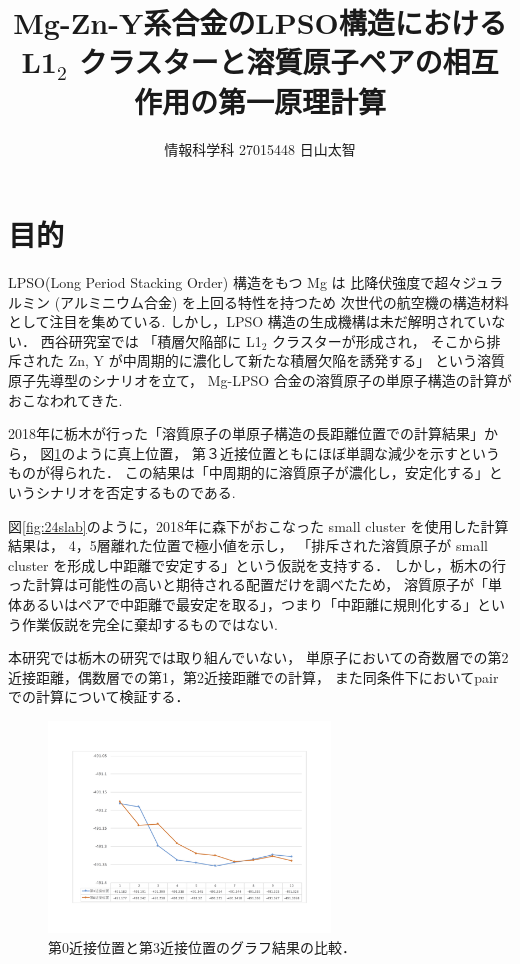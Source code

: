 \documentclass[a4j,twocolumn]{jsarticle}
\begin{document}
\title{Mg-Zn-Y系合金のLPSO構造におけるL1$_2$ 
クラスターと溶質原子ペアの相互作用の第一原理計算}
\author{情報科学科 \hspace{5mm} 27015448 \hspace{5mm} 日山太智}
\date{}
\maketitle

\section{目的}

LPSO(Long Period Stacking Order) 構造をもつ Mg は
比降伏強度で超々ジュラルミン (アルミニウム合金) を上回る特性を持つため
次世代の航空機の構造材料として注目を集めている.
しかし，LPSO 構造の生成機構は未だ解明されていない．
西谷研究室では
「積層欠陥部に L1$_2$ クラスターが形成され，
そこから排斥された Zn, Y が中周期的に濃化して新たな積層欠陥を誘発する」
という溶質原子先導型のシナリオを立て，
Mg-LPSO 合金の溶質原子の単原子構造の計算がおこなわれてきた.

2018年に栃木が行った「溶質原子の単原子構造の長距離位置での計算結果」から，
図\ref{fig:0_3}のように真上位置，
第３近接位置ともにほぼ単調な減少を示すというものが得られた．
この結果は「中周期的に溶質原子が濃化し，安定化する」というシナリオを否定するものである\cite{tochigi}.

図\ref{fig:24slab}のように，2018年に森下がおこなった small cluster を使用した計算結果は，
4，5層離れた位置で極小値を示し，
「排斥された溶質原子が small cluster を形成し中距離で安定する」という仮説を支持する\cite{donkey}．
しかし，栃木の行った計算は可能性の高いと期待される配置だけを調べたため，
溶質原子が「単体あるいはペアで中距離で最安定を取る」，つまり「中距離に規則化する」という作業仮説を完全に棄却するものではない\cite{tochigi}.

本研究では栃木の研究では取り組んでいない，
単原子においての奇数層での第2近接距離，偶数層での第1，第2近接距離での計算，
また同条件下においてpairでの計算について検証する．

\begin{figure}[h]
\vspace{0\baselineskip}
\begin{center}
   \includegraphics[width=75mm]{../png/0_3garaf.png}
  \caption{第0近接位置と第3近接位置のグラフ結果の比較\cite{tochigi}．}
  \label{fig:0_3}
\end{center}
\end{figure}
\end{document}

